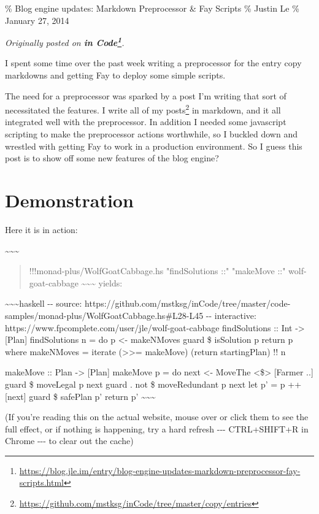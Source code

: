 \documentclass[]{article}
\renewcommand{\href}[2]{#2\footnote{\url{#1}}}
\begin{document}
\% Blog engine updates: Markdown Preprocessor \& Fay Scripts \% Justin Le \%
January 27, 2014

\emph{Originally posted on
\textbf{\href{https://blog.jle.im/entry/blog-engine-updates-markdown-preprocessor-fay-scripts.html}{in
Code}}.}

I spent some time over the past week writing a preprocessor for the entry copy
markdowns and getting Fay to deploy some simple scripts.

The need for a preprocessor was sparked by a post I'm writing that sort of
necessitated the features. I write
\href{https://github.com/mstksg/inCode/tree/master/copy/entries}{all of my
posts} in markdown, and it all integrated well with the preprocessor. In
addition I needed some javascript scripting to make the preprocessor actions
worthwhile, so I buckled down and wrestled with getting Fay to work in a
production environment. So I guess this post is to show off some new features of
the blog engine?

\section{Demonstration}

Here it is in action:

\textasciitilde{}\textasciitilde{}\textasciitilde{}

\begin{quote}
!!!monad-plus/WolfGoatCabbage.hs "findSolutions ::" "makeMove ::"
wolf-goat-cabbage \textasciitilde{}\textasciitilde{}\textasciitilde{} yields:
\end{quote}

\textasciitilde{}\textasciitilde{}\textasciitilde{}haskell -\/- source:
https://github.com/mstksg/inCode/tree/master/code-samples/monad-plus/WolfGoatCabbage.hs\#L28-L45
-\/- interactive: https://www.fpcomplete.com/user/jle/wolf-goat-cabbage
findSolutions :: Int -\textgreater{} {[}Plan{]} findSolutions n = do p
\textless{}- makeNMoves guard \$ isSolution p return p where makeNMoves =
iterate (\textgreater{}\textgreater{}= makeMove) (return startingPlan) !! n

makeMove :: Plan -\textgreater{} {[}Plan{]} makeMove p = do next \textless{}-
MoveThe \textless{}\$\textgreater{} {[}Farmer ..{]} guard \$ moveLegal p next
guard . not \$ moveRedundant p next let p' = p ++ {[}next{]} guard \$ safePlan
p' return p' \textasciitilde{}\textasciitilde{}\textasciitilde{}

(If you're reading this on the actual website, mouse over or click them to see
the full effect, or if nothing is happening, try a hard refresh -\/-\/-
CTRL+SHIFT+R in Chrome -\/-\/- to clear out the cache)
\end{document}

